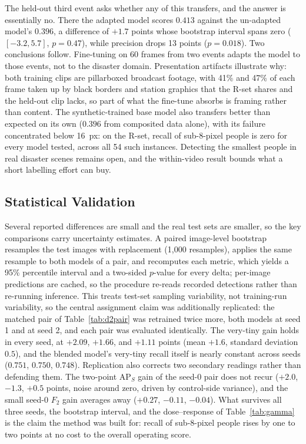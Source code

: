 The held-out third event asks whether any of this transfers, and the answer is
essentially no. There the adapted model scores $0.413$ against the un-adapted
model's $0.396$, a difference of $+1.7$ points whose bootstrap interval spans
zero ($[-3.2, 5.7]$, $p=0.47$), while precision drops 13 points
($p=0.018$). Two conclusions follow. Fine-tuning on 60
frames from two events adapts the model to those events, not to the disaster
domain. Presentation artifacts illustrate why: both training clips are
pillarboxed broadcast footage, with 41\% and 47\% of each frame taken up by
black borders and station graphics that the R-set shares and the held-out
clip lacks, so part of what the fine-tune absorbs is framing rather than
content. The synthetic-trained base model also transfers better than expected
on its own ($0.396$ from composited data alone), with its failure
concentrated below 16~px: on the R-set, recall of sub-8-pixel people is zero
for every model tested, across all 54 such instances. Detecting the smallest
people in real disaster scenes remains open, and the within-video result
bounds what a short labelling effort can buy.

\subsection{Statistical Validation}
\label{sec:stats}
Several reported differences are small and the real test sets are smaller, so
the key comparisons carry uncertainty estimates. A paired image-level
bootstrap resamples the test images with replacement (1{,}000 resamples),
applies the same resample to both models of a pair, and recomputes each
metric, which yields a 95\% percentile interval and a two-sided $p$-value for
every delta; per-image predictions are cached, so the procedure re-reads
recorded detections rather than re-running inference. This treats test-set
sampling variability, not training-run variability, so the central assignment
claim was additionally replicated: the matched pair of Table~\ref{tab:d2pair}
was retrained twice more, both models at seed 1 and at seed 2, and each pair
was evaluated identically. The very-tiny gain holds in every seed, at
$+2.09$, $+1.66$, and $+1.11$ points (mean $+1.6$, standard deviation
$0.5$), and the blended model's very-tiny recall itself is nearly constant
across seeds ($0.751$, $0.750$, $0.748$). Replication also corrects two
secondary readings rather than defending them. The two-point $\mathrm{AP}_S$
gain of the seed-0 pair does not recur ($+2.0$, $-1.3$, $+0.5$ points,
noise around zero, driven by control-side variance), and the small seed-0
$F_2$ gain averages away ($+0.27$, $-0.11$, $-0.04$). What survives all
three seeds, the bootstrap interval, and the dose--response of
Table~\ref{tab:gamma} is the claim the method was built for: recall of
sub-8-pixel people rises by one to two points at no cost to the overall
operating score.

